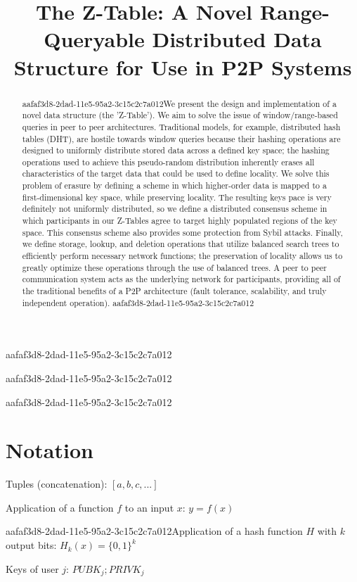 \documentclass[12pt]{article}
\title{The Z-Table: A Novel Range-Queryable Distributed Data Structure for Use in P2P Systems}
\begin{document}
aafaf3d8-2dad-11e5-95a2-3c15c2c7a012\maketitle
aafaf3d8-2dad-11e5-95a2-3c15c2c7a012
\begin{abstract}
aafaf3d8-2dad-11e5-95a2-3c15c2c7a012We present the design and implementation of a novel data structure (the 'Z-Table'). We aim to solve the issue of window/range-based queries in peer to peer architectures. Traditional models, for example,  distributed hash tables (DHT), are hostile towards window queries because their hashing operations are designed to uniformly distribute stored data across a defined key space; the hashing operations used to achieve this pseudo-random distribution inherently erases all characteristics of the target data that could be used to define locality. We solve this problem of erasure by defining a scheme in which higher-order data is mapped to a first-dimensional key space, while preserving locality. The resulting keys pace is very definitely not uniformly distributed, so we define a distributed consensus scheme in which participants in our Z-Tables agree to target highly populated regions of the key space. This consensus scheme also provides some protection from Sybil attacks. Finally, we define storage, lookup, and deletion operations that utilize balanced search trees to efficiently perform necessary network functions; the preservation of locality allows us to greatly optimize these operations through the use of balanced trees. A peer to peer communication system acts as the underlying network for participants, providing all of the traditional benefits of a P2P architecture (fault tolerance, scalability, and truly independent operation).
aafaf3d8-2dad-11e5-95a2-3c15c2c7a012\end{abstract}
aafaf3d8-2dad-11e5-95a2-3c15c2c7a012
\section{Notation}

Tuples (concatenation): $[a,b,c,...]$

Application of a function $f$ to an input $x$: $y=f(x)$

aafaf3d8-2dad-11e5-95a2-3c15c2c7a012Application of a hash function $H$ with $k$ output bits: $H_{k}(x) = \{0,1\}^k$

Keys of user $j$: $ PUBK_j; PRIVK_j $
\end{document}
